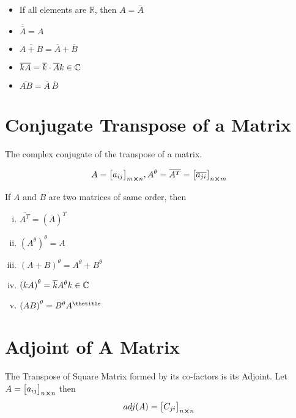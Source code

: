 \documentclass{article}
\begin{document}
\begin{itemize}
    \item If all elements are $\mathbb{R} $, then $A=\overline{A}$
    \item $\overline{\overline{A}}=A$
    \item $\overline{A+B}=\overline{A}+\overline{B}$
    \item $\overline{kA}=\overline{k} \cdot \overline{A} \hfill k \in \mathbb{C} $
    \item $\overline{AB}=\overline{A} \, \overline{B} $
\end{itemize}

\section{Conjugate Transpose of a Matrix}
The complex conjugate of the transpose of a matrix.

$$A={\begin{bmatrix}
        a_{ij}
    \end{bmatrix}}_{m \cross n}, A^{\theta} =\overline{A^T}={\begin{bmatrix}
        \overline{a_{ji}}
    \end{bmatrix}}_{n \cross m} $$

If $A$ and $B$ are two matrices of same order, then
\begin{enumerate}[i.]
    \item $\overline{A^T}=\left(\overline{A}\right)^T$
    \item $\left(A^\theta\right)^\theta=A$
    \item $\left(A+B\right)^\theta=A^\theta+B^\theta $
    \item $\left(kA\right)^\theta=\overline{k} A^\theta \hfill k \in \mathbb{C} $
    \item $\left(AB\right)^\theta=B^\theta A^\thetitle $
\end{enumerate}

\section{Adjoint of A Matrix}
The Transpose of Square Matrix formed by its co-factors is its Adjoint.
\newline \newline
Let $A={\begin{bmatrix}
        a_{ij}
    \end{bmatrix}}_{n \cross n} $
\newline \newline
then $$adj(A)={\begin{bmatrix}
        C_{ji}
    \end{bmatrix}}_{n \cross n} $$
\end{document}
